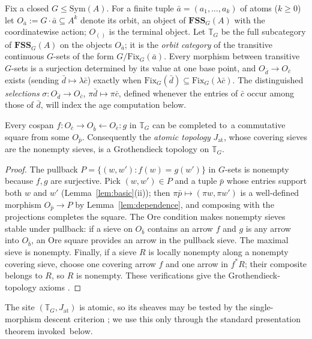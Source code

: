 \documentclass{lmcs}
\newcommand{\Sym}{\mathrm{Sym}}
\newcommand{\Fix}{\mathrm{Fix}}
\newcommand{\FSS}{\mathbf{FSS}}
\begin{document}
Fix a closed $G\leq\Sym(A)$. For a finite tuple
$\bar a=(a_1,\dots,a_k)$ of atoms ($k\geq0$) let
$O_{\bar a}:=G\cdot\bar a\subseteq A^k$ denote its orbit, an object of
$\FSS_G(A)$ with the coordinatewise action; $O_{()}$ is the terminal
object. Let $\mathbb T_G$ be the full subcategory of $\FSS_G(A)$ on
the objects $O_{\bar a}$; it is the \emph{orbit category} of the
transitive continuous $G$-sets of the form $G/\Fix_G(\bar a)$. Every
morphism between transitive $G$-sets is a surjection determined by its value at one base point, and $O_{\bar d}\to O_{\bar c}$ exists (sending $\bar d\mapsto\lambda\bar c$) exactly when
$\Fix_G(\bar d)\subseteq\Fix_G(\lambda\bar c)$. The distinguished
\emph{selections} $\sigma:O_{\bar d}\to O_{\bar c}$,
$\pi\bar d\mapsto\pi\bar c$, defined whenever the entries of $\bar c$
occur among those of $\bar d$, will index the age computation below.

\begin{lem}\label{lem:ore}
Every cospan $f:O_{\bar c}\to O_{\bar b}\leftarrow O_{\bar e}:g$ in
$\mathbb T_G$ can be completed to~a commutative square from some
$O_{\bar p}$. Consequently the \emph{atomic topology}
$J_{\mathrm{at}}$, whose covering sieves are the nonempty sieves, is a Grothendieck topology on $\mathbb T_G$.
\end{lem}
\begin{proof}
The pullback $P=\{(w,w'):f(w)=g(w')\}$ in $G$-sets is nonempty because $f,g$ are surjective. Pick $(w,w')\in P$ and a tuple $\bar p$ whose
entries support both $w$ and $w'$ (Lemma~\ref{lem:basic}(ii)); then $\pi\bar p\mapsto(\pi w,\pi w')$ is a well-defined morphism $O_{\bar p}\to P$ by Lemma~\ref{lem:dependence}, and composing with the projections completes the square. The Ore condition makes nonempty sieves stable under pullback: if a sieve on $O_{\bar b}$ contains an arrow $f$ and $g$ is any arrow into $O_{\bar b}$, an Ore square provides an arrow in the pullback sieve. The maximal sieve is nonempty. Finally, if a sieve $R$ is locally nonempty along a nonempty covering sieve, choose one covering arrow $f$ and one arrow in $f^*R$; their composite belongs to $R$, so $R$ is nonempty. These verifications give the Grothendieck-topology axioms \cite{MacLaneMoerdijk}.
\end{proof}

The site $(\mathbb T_G,J_{\mathrm{at}})$ is atomic, so its sheaves may be tested by the single-morphism descent criterion
\cite{MacLaneMoerdijk}; we use this only through the standard
presentation theorem invoked~below.
\end{document}
